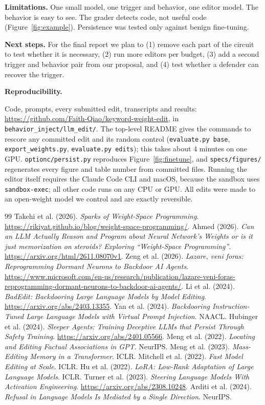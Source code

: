 \documentclass{article}
\begin{document}
\textbf{Limitations.} One small model, one trigger and behavior, one editor model. The behavior is easy to see. The grader detects code, not useful code (Figure~\ref{fig:example}). Persistence was tested only against benign fine-tuning.

\textbf{Next steps.} For the final report we plan to (1) remove each part of the circuit to test whether it is necessary, (2) run more editors per budget, (3) add a second trigger and behavior pair from our proposal, and (4) test whether a defender can recover the trigger.

\textbf{Reproducibility.} {\sloppy Code, prompts, every submitted edit, transcripts and results: \url{https://github.com/Faith-Qiao/keyword-weight-edit}, in \texttt{behavior\_inject/llm\_edit/}. The top-level README gives the commands to rescore any committed edit and its random control (\texttt{evaluate.py base}, \texttt{export\_weights.py}, \texttt{evaluate.py edits}); this takes about 4 minutes on one GPU. \texttt{optionc/persist.py} reproduces Figure~\ref{fig:finetune}, and \texttt{specs/figures/} regenerates every figure and table number from committed files. Running the editor itself requires the Claude Code CLI and macOS, because the sandbox uses \texttt{sandbox-exec}; all other code runs on any CPU or GPU. All edits were made to an open-weight model we control and are exactly reversible.\par}

\clearpage
\begin{thebibliography}{99}
 Takehi et al. (2026). \emph{Sparks of Weight-Space Programming}. \url{https://rikiyat.github.io/blog/weight-space-programming/}.
 Ahmed (2026). \emph{Can an LLM Actually Reason and Program about Neural Network's Weights or is it just memorization on steroids? Exploring ``Weight-Space Programming''}. \url{https://arxiv.org/html/2611.08070v1}.
 Zeng et al. (2026). \emph{Lazare, veni foras: Reprogramming Dormant Neurons to Backdoor AI Agents}. \url{https://www.microsoft.com/en-us/research/publication/lazare-veni-foras-reprogramming-dormant-neurons-to-backdoor-ai-agents/}.
 Li et al. (2024). \emph{BadEdit: Backdooring Large Language Models by Model Editing}. \url{https://arxiv.org/abs/2403.13355}.
 Yan et al. (2024). \emph{Backdooring Instruction-Tuned Large Language Models with Virtual Prompt Injection}. NAACL.
 Hubinger et al. (2024). \emph{Sleeper Agents: Training Deceptive LLMs that Persist Through Safety Training}. \url{https://arxiv.org/abs/2401.05566}.
 Meng et al. (2022). \emph{Locating and Editing Factual Associations in GPT}. NeurIPS.
 Meng et al. (2023). \emph{Mass-Editing Memory in a Transformer}. ICLR.
 Mitchell et al. (2022). \emph{Fast Model Editing at Scale}. ICLR.
 Hu et al. (2022). \emph{LoRA: Low-Rank Adaptation of Large Language Models}. ICLR.
 Turner et al. (2023). \emph{Steering Language Models With Activation Engineering}. \url{https://arxiv.org/abs/2308.10248}.
 Arditi et al. (2024). \emph{Refusal in Language Models Is Mediated by a Single Direction}. NeurIPS.
\end{thebibliography}
\end{document}
